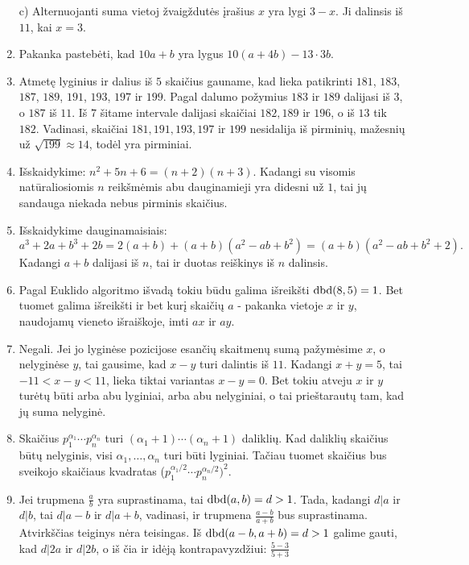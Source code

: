\begin{enumerate}
    c) Alternuojanti suma vietoj žvaigždutės įrašius $x$ yra lygi
    $3-x$. Ji dalinsis iš $11$, kai $x=3$.
\item
    Pakanka pastebėti, kad $10a+b$ yra lygus $10(a+4b) -13\cdot 3b$.
\item
    Atmetę lyginius ir dalius iš $5$ skaičius gauname, kad lieka
    patikrinti $181$, $183$, $187$, $189$, $191$, $193$, $197$ ir $199$. Pagal dalumo
    požymius $183$ ir $189$ dalijasi iš $3$, o $187$ iš $11$. Iš
    $7$ šitame intervale dalijasi skaičiai $182, 189$ ir $196$, o iš
    $13$ tik $182$. Vadinasi, skaičiai $181, 191, 193, 197$ ir $199$
    nesidalija iš pirminių, mažesnių už $\sqrt{199} \approx 14$, todėl
    yra pirminiai.
\item
    Išskaidykime: $n^2 + 5n + 6 = (n+2)(n+3)$. Kadangi su visomis
    natūraliosiomis $n$ reikšmėmis abu dauginamieji yra didesni už
    $1$, tai jų sandauga niekada nebus pirminis skaičius.
\item
    Išskaidykime dauginamaisiais: $$a^3 + 2a + b^3 + 2b = 2(a+b) + (a+b)(a^2
    -ab + b^2) = (a+b)(a^2 -ab+b^2+2).$$ Kadangi $a+b$ dalijasi iš $n$, tai
    ir duotas reiškinys iš $n$ dalinsis.
\item
    Pagal Euklido algoritmo išvadą tokiu būdu galima išreikšti
    $\operatorname{dbd}(8,5)=1$. Bet tuomet galima išreikšti ir bet kurį skaičių
    $a$ - pakanka vietoje $x$ ir $y$, naudojamų vieneto išraiškoje, imti
    $ax$ ir $ay$.
\item
    Negali. Jei jo lyginėse pozicijose esančių skaitmenų sumą pažymėsime
    $x$, o nelyginėse $y$, tai gausime, kad $x-y$ turi dalintis iš
    $11$. Kadangi $x+y=5$, tai $-11 <x-y< 11$, lieka tiktai variantas
    $x-y=0$. Bet tokiu atveju $x$ ir $y$ turėtų būti arba abu lyginiai,
    arba abu nelyginiai, o tai prieštarautų tam, kad jų suma nelyginė.
\item
    Skaičius $p_1^{\alpha_1} \cdots p_n^{\alpha_n}$ turi $(\alpha_1 +
    1)\cdots(\alpha_n+1)$ daliklių. Kad daliklių skaičius būtų nelyginis,
    visi $\alpha_1, \dots ,\alpha_n$ turi būti lyginiai. Tačiau tuomet
    skaičius bus sveikojo skaičiaus kvadratas ($p_1^{\alpha_1/2} \cdots
    p_n^{\alpha_n/2})^2$.
\item
    Jei trupmena $\frac{a}{b}$ yra suprastinama, tai $\operatorname{dbd}(a,b)=d>1$.
    Tada, kadangi $d|a$ ir $d|b$, tai $d|a-b$ ir $d|a+b$, vadinasi, ir
    trupmena $\frac{a-b}{a+b}$ bus suprastinama. Atvirkščias teiginys nėra
    teisingas. Iš $\operatorname{dbd}(a-b,a+b)=d>1$ galime gauti, kad $d|2a$ ir
    $d|2b$, o iš čia ir idėją kontrapavyzdžiui: $\frac{5-3}{5+3}$

\end{enumerate}
